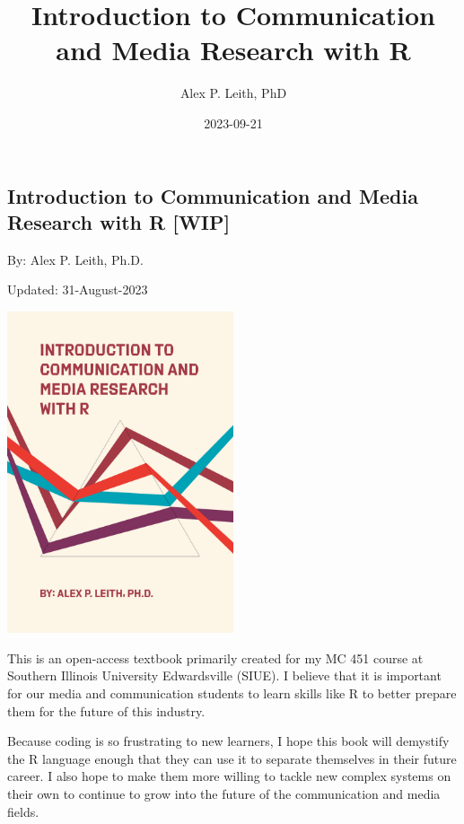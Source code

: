\documentclass[
  b5paper]{book}
\title{Introduction to Communication and Media Research with R}
\author{Alex P. Leith, PhD}
\date{2023-09-21}
\begin{document}
\maketitle

{
\setcounter{tocdepth}{1}
\tableofcontents
}
\hypertarget{section}{%
\chapter*{}\label{section}}

\hypertarget{introduction-to-communication-and-media-research-with-r-wip}{%
\section*{Introduction to Communication and Media Research with R {[}WIP{]}}\label{introduction-to-communication-and-media-research-with-r-wip}}

By: Alex P. Leith, Ph.D.

Updated: 31-August-2023

\href{Current\%20Book\%20Cover\%20(Art\%20created\%20with\%20R\textquotesingle{}s\%20aRtsy\%20package)}{\includegraphics[width=0.5\textwidth,height=\textheight]{cover_2.png}}

This is an open-access textbook primarily created for my MC 451 course at Southern Illinois University Edwardsville (SIUE). I believe that it is important for our media and communication students to learn skills like R to better prepare them for the future of this industry.

Because coding is so frustrating to new learners, I hope this book will demystify the R language enough that they can use it to separate themselves in their future career. I also hope to make them more willing to tackle new complex systems on their own to continue to grow into the future of the communication and media fields.
\end{document}

